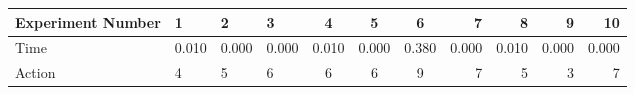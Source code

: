\documentclass[8pt]{article}
\begin{document}
\begin{landscape}
\begin{tabular}{ | l | l | l | l | c | c | c | r | r | r | r | }
 \hline 
Experiment Number & 1 & 2 & 3 & 4 & 5 & 6 & 7 & 8 & 9 & 10\\ \hline
Time & 0.010 & 0.000 & 0.000 & 0.010 & 0.000 & 0.380 & 0.000 & 0.010 & 0.000 & 0.000\\ \hline
Action & 4 & 5 & 6 & 6 & 6 & 9 & 7 & 5 & 3 & 7\\ \hline\end{tabular}
\end{landscape}
\end{document}
